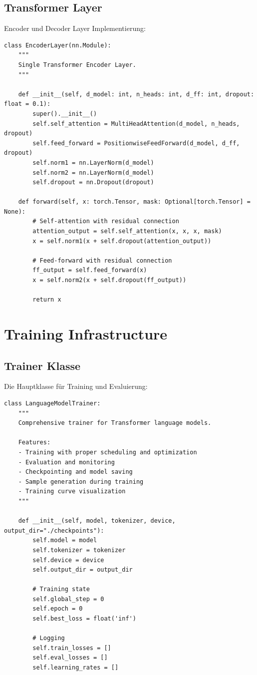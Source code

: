\subsection{Transformer Layer}

Encoder und Decoder Layer Implementierung:

\begin{lstlisting}[style=pythonstyle, caption=Encoder Layer]
class EncoderLayer(nn.Module):
    """
    Single Transformer Encoder Layer.
    """
    
    def __init__(self, d_model: int, n_heads: int, d_ff: int, dropout: float = 0.1):
        super().__init__()
        self.self_attention = MultiHeadAttention(d_model, n_heads, dropout)
        self.feed_forward = PositionwiseFeedForward(d_model, d_ff, dropout)
        self.norm1 = nn.LayerNorm(d_model)
        self.norm2 = nn.LayerNorm(d_model)
        self.dropout = nn.Dropout(dropout)
    
    def forward(self, x: torch.Tensor, mask: Optional[torch.Tensor] = None):
        # Self-attention with residual connection
        attention_output = self.self_attention(x, x, x, mask)
        x = self.norm1(x + self.dropout(attention_output))
        
        # Feed-forward with residual connection
        ff_output = self.feed_forward(x)
        x = self.norm2(x + self.dropout(ff_output))
        
        return x
\end{lstlisting}

\section{Training Infrastructure}

\subsection{Trainer Klasse}

Die Hauptklasse für Training und Evaluierung:

\begin{lstlisting}[style=pythonstyle, caption=Training Infrastructure]
class LanguageModelTrainer:
    """
    Comprehensive trainer for Transformer language models.
    
    Features:
    - Training with proper scheduling and optimization
    - Evaluation and monitoring
    - Checkpointing and model saving
    - Sample generation during training
    - Training curve visualization
    """
    
    def __init__(self, model, tokenizer, device, output_dir="./checkpoints"):
        self.model = model
        self.tokenizer = tokenizer
        self.device = device
        self.output_dir = output_dir
        
        # Training state
        self.global_step = 0
        self.epoch = 0
        self.best_loss = float('inf')
        
        # Logging
        self.train_losses = []
        self.eval_losses = []
        self.learning_rates = []
\end{lstlisting}


